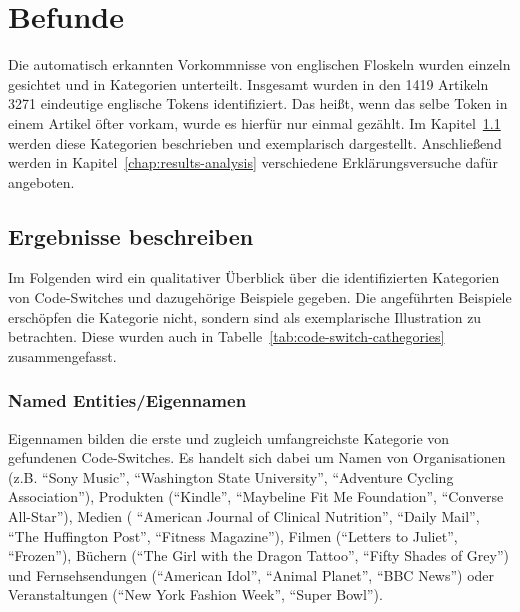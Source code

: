 \section{Befunde}
\label{chap:results}


Die automatisch erkannten Vorkommnisse von englischen Floskeln wurden einzeln gesichtet und in Kategorien unterteilt.
Insgesamt wurden in den 1419 Artikeln 3271 eindeutige englische Tokens identifiziert. %
Das heißt, wenn das selbe Token in einem Artikel öfter vorkam, wurde es hierfür nur einmal gezählt.
Im Kapitel~\ref{chap:results-desc} werden diese Kategorien beschrieben und exemplarisch dargestellt.
Anschließend werden in Kapitel~\ref{chap:results-analysis} verschiedene Erklärungsversuche dafür angeboten.


\subsection{Ergebnisse beschreiben}
\label{chap:results-desc}

Im Folgenden wird ein qualitativer Überblick über die identifizierten Kategorien von Code-Switches und dazugehörige Beispiele gegeben.
Die angeführten Beispiele erschöpfen die Kategorie nicht, sondern sind als exemplarische Illustration zu betrachten.
Diese wurden auch in Tabelle~\ref{tab:code-switch-cathegories} zusammengefasst.

\subsubsection{Named Entities/Eigennamen}
Eigennamen bilden die erste und zugleich umfangreichste Kategorie von gefundenen Code-Switches.
Es handelt sich dabei um Namen von Organisationen (z.B. ``Sony Music'', ``Washington State University'', ``Adventure Cycling Association''),
Produkten (``Kindle'', ``Maybeline Fit Me Foundation'', ``Converse All-Star''),
Medien ( ``American Journal of Clinical Nutrition'', ``Daily Mail'', ``The Huffington Post'', ``Fitness Magazine''),
Filmen (``Letters to Juliet'', ``Frozen''),
Büchern (``The Girl with the Dragon Tattoo'', ``Fifty Shades of Grey'')
und Fernsehsendungen (``American Idol'', ``Animal Planet'', ``BBC News'')
oder Veranstaltungen (``New York Fashion Week'', ``Super Bowl'').

